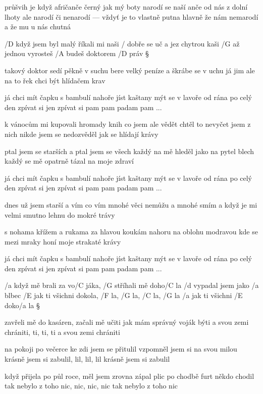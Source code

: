 průšvih je když afričanče
černý jak mý boty
narodí se naší anče od nás z dolní lhoty
ale narodí či nenarodí --- vždyť je to vlastně putna
hlavně že nám nemarodí
a že mu u nás chutná




/D když jsem byl malý říkali mi naši
/ dobře se uč a jez chytrou kaši
/G až jednou vyrosteš /A budeš doktorem /D práv \S

takový doktor sedí pěkně v suchu
bere velký peníze a škrábe se v uchu
já jim ale na to řek chci být hlídačem krav \s

já chci mít čapku s bambulí nahoře
jíst kaštany mýt se v lavoře
od rána po celý den
zpívat si jen
zpívat si pam pam padam pam ... \s

k vánocům mi kupovali hromady knih
co jsem ale vědět chtěl to nevyčet jsem z nich
nikde jsem se nedozvěděl jak se hlídají krávy \s

ptal jsem se starších a ptal jsem se všech
každý na mě hleděl jako na pytel blech
každý se mě opatrně tázal na moje zdraví \s

já chci mít čapku s bambulí nahoře
jíst kaštany mýt se v lavoře
od rána po celý den
zpívat si jen
zpívat si pam pam padam pam ... \s

dnes už jsem starší a vím co vím
mnohé věci nemůžu a mnohé smím
a když je mi velmi smutno lehnu do mokré trávy \s

s nohama křížem a rukama za hlavou
koukám nahoru na oblohu modravou
kde se mezi mraky honí moje strakaté krávy \s

já chci mít čapku s bambulí nahoře
jíst kaštany mýt se v lavoře
od rána po celý den
zpívat si jen
zpívat si pam pam padam pam ...




/a když mě brali za vo/C jáka, /G stříhali mě doho/C la
/d vypadal jsem jako /a blbec
/E jak ti všichni dokola, /F la, /G la, /C la, /G la
/a jak ti všichni /E doko/a la \S

zavřeli mě do kasáren, začali mě učiti
jak mám správný voják býti
a svou zemi chrániti, ti, ti, ti
a svou zemi chrániti \s

na pokoji po večerce ke zdi jsem se přitulil
vzpomněl jsem si na svou milou
krásně jsem si zabulil, lil, lil, lil
krásně jsem si zabulil \s

když přijela po půl roce, měl jsem zrovna zápal plic
po chodbě furt někdo chodil
tak nebylo z toho nic, nic, nic, nic
tak nebylo z toho nic \s

